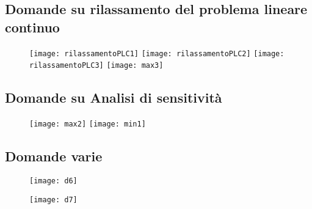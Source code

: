 \documentclass[\main/main.tex]{subfiles}
\begin{document}
\subsection{Domande su rilassamento del problema lineare continuo}
\begin{figure}
  \texttt{[image: rilassamentoPLC1]}
  \texttt{[image: rilassamentoPLC2]}
  \texttt{[image: rilassamentoPLC3]}
  \texttt{[image: max3]}
\end{figure}
\subsection{Domande su Analisi di sensitività}
\begin{figure}
  \texttt{[image: max2]}
  \texttt{[image: min1]}
\end{figure}
\subsection{Domande varie}
\begin{figure}
  \texttt{[image: d6]}
\end{figure}
\begin{figure}
  \texttt{[image: d7]}
\end{figure}
\end{document}
